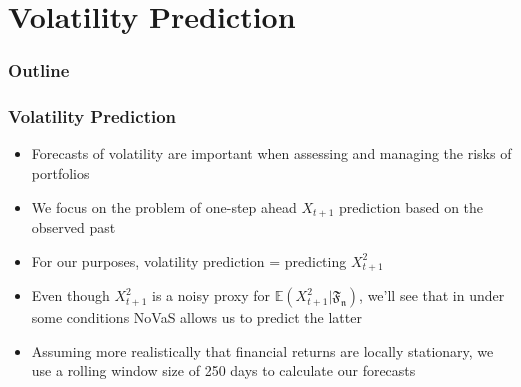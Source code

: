 \documentclass{beamer}
\begin{document}



\section{Volatility Prediction}

\begin{frame}
\frametitle{Outline}
\tableofcontents[currentsection]
\end{frame}

\begin{frame}
\frametitle{Volatility Prediction}

\begin{itemize}
\item{Forecasts of volatility are important when assessing and managing the risks of portfolios}
\vspace{3pt}
\item{We focus on the problem of one-step ahead $X_{t+1}$ prediction based on the observed past}
\vspace{3pt}
\item{For our purposes, volatility prediction = predicting $X_{t+1}^2$}
\vspace{3pt}
\item{Even though $X_{t+1}^2$ is a noisy proxy for $\mathbb{E}(X_{t+1}^2|\mathfrak{F_n})$, we'll see that in under some conditions NoVaS allows us to predict the latter}
\vspace{3pt}
\item{Assuming more realistically that financial returns are locally stationary, we use a rolling window size of 250 days to calculate our forecasts}
\end{itemize}
\end{frame}
\end{document}
